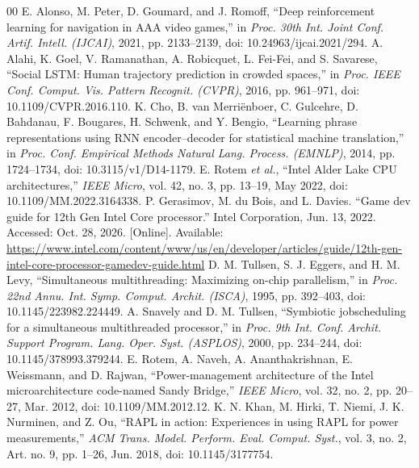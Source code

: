 \documentclass[conference]{IEEEtran}
\begin{document}
\begin{thebibliography}{00}
 E. Alonso, M. Peter, D. Goumard, and J. Romoff, ``Deep reinforcement learning for navigation in AAA video games,'' in \textit{Proc. 30th Int. Joint Conf. Artif. Intell. (IJCAI)}, 2021, pp. 2133--2139, doi: 10.24963/ijcai.2021/294.
 A. Alahi, K. Goel, V. Ramanathan, A. Robicquet, L. Fei-Fei, and S. Savarese, ``Social LSTM: Human trajectory prediction in crowded spaces,'' in \textit{Proc. IEEE Conf. Comput. Vis. Pattern Recognit. (CVPR)}, 2016, pp. 961--971, doi: 10.1109/CVPR.2016.110.
 K. Cho, B. van Merri\"{e}nboer, C. Gulcehre, D. Bahdanau, F. Bougares, H. Schwenk, and Y. Bengio, ``Learning phrase representations using RNN encoder--decoder for statistical machine translation,'' in \textit{Proc. Conf. Empirical Methods Natural Lang. Process. (EMNLP)}, 2014, pp. 1724--1734, doi: 10.3115/v1/D14-1179.
 E. Rotem \textit{et al.}, ``Intel Alder Lake CPU architectures,'' \textit{IEEE Micro}, vol. 42, no. 3, pp. 13--19, May 2022, doi: 10.1109/MM.2022.3164338.
 P. Gerasimov, M. du Bois, and L. Davies. ``Game dev guide for 12th Gen Intel Core processor.'' Intel Corporation, Jun. 13, 2022. Accessed: Oct. 28, 2026. [Online]. Available: \url{https://www.intel.com/content/www/us/en/developer/articles/guide/12th-gen-intel-core-processor-gamedev-guide.html}
 D. M. Tullsen, S. J. Eggers, and H. M. Levy, ``Simultaneous multithreading: Maximizing on-chip parallelism,'' in \textit{Proc. 22nd Annu. Int. Symp. Comput. Archit. (ISCA)}, 1995, pp. 392--403, doi: 10.1145/223982.224449.
 A. Snavely and D. M. Tullsen, ``Symbiotic jobscheduling for a simultaneous multithreaded processor,'' in \textit{Proc. 9th Int. Conf. Archit. Support Program. Lang. Oper. Syst. (ASPLOS)}, 2000, pp. 234--244, doi: 10.1145/378993.379244.
 E. Rotem, A. Naveh, A. Ananthakrishnan, E. Weissmann, and D. Rajwan, ``Power-management architecture of the Intel microarchitecture code-named Sandy Bridge,'' \textit{IEEE Micro}, vol. 32, no. 2, pp. 20--27, Mar. 2012, doi: 10.1109/MM.2012.12.
 K. N. Khan, M. Hirki, T. Niemi, J. K. Nurminen, and Z. Ou, ``RAPL in action: Experiences in using RAPL for power measurements,'' \textit{ACM Trans. Model. Perform. Eval. Comput. Syst.}, vol. 3, no. 2, Art. no. 9, pp. 1--26, Jun. 2018, doi: 10.1145/3177754.

\end{thebibliography}
\end{document}

